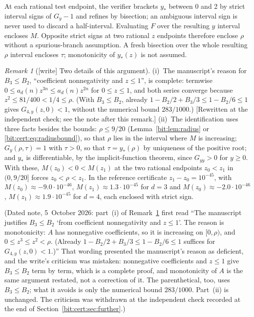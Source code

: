 \documentclass[11pt]{article}
\theoremstyle{definition}\newtheorem{definition}[theorem]{Definition}
\theoremstyle{remark}\newtheorem{remark}[theorem]{Remark}
\begin{document}
At each rational test endpoint, the verifier brackets $y_*$ between 0 and 2 by
strict interval signs of $G_y-1$ and refines by bisection; an ambiguous
interval sign is never used to discard a half-interval. Evaluating $F$ over the
resulting $y$ interval encloses $M$. Opposite strict signs at two rational $z$
endpoints therefore enclose $\rho$ without a spurious-branch assumption. A fresh
bisection over the whole resulting $\rho$ interval encloses $\tau$;
monotonicity of $y_*(z)$ is not assumed.

\begin{remark}[\textsf{[write]} Two details of this argument]\label{bit:cert:rem:identify}
(i)~The manuscript's reason for $B_3\le B_2$, ``coefficient nonnegativity and
$z\le1$'', is complete: termwise $0\le a_d(n)z^{3n}\le a_d(n)z^{2n}$ for
$0\le z\le1$, and both series converge because $z^2\le81/400<1/4\le\rho$.
(With $B_3\le B_2$, already $1-B_2/2+B_3/3\le1-B_2/6\le1$ gives
$G_{4,y}(z,0)<1$, without the numerical bound $283/1000$.)
\textup{[}Rewritten at the independent check; see the note after this
remark.\textup{]}
(ii)~The identification uses three facts besides the bounds: $\rho\le9/20$
(Lemma~\ref{bit:lem:radius} or \eqref{bit:cert:eq:radiusbound}), so that
$\rho$ lies in the interval where $M$ is increasing; $G_y(\rho,\tau)=1$ with
$\tau>0$, so that $\tau=y_*(\rho)$ by uniqueness of the positive root; and
$y_*$ is differentiable, by the implicit-function theorem, since
$G_{yy}>0$ for $y\ge0$. With these, $M(z_0)<0<M(z_1)$ at the two rational
endpoints $z_0<z_1$ in $(0,9/20]$ forces $z_0<\rho<z_1$. In the reference
certificate $z_1-z_0=10^{-45}$, with $M(z_0)\approx-9.0\cdot10^{-46}$,
$M(z_1)\approx1.3\cdot10^{-45}$ for $d=3$ and $M(z_0)\approx-2.0\cdot10^{-46}$,
$M(z_1)\approx1.9\cdot10^{-45}$ for $d=4$, each enclosed with strict sign.
\end{remark}
\noindent(Dated note, 5~October 2026: part~(i) of
Remark~\ref{bit:cert:rem:identify} first read ``The manuscript justifies
$B_3\le B_2$ `from coefficient nonnegativity and $z\le1$'. The reason is
monotonicity: $A$ has nonnegative coefficients, so it is increasing on
$[0,\rho)$, and $0\le z^3\le z^2<\rho$. (Already
$1-B_2/2+B_3/3\le1-B_2/6\le1$ suffices for $G_{4,y}(z,0)<1$.)'' That wording
presented the manuscript's reason as deficient, and the write's criticism was
mistaken: nonnegative coefficients and $z\le1$ give $B_3\le B_2$ term by term,
which is a complete proof, and monotonicity of $A$ is the same argument
restated, not a correction of it. The parenthetical, too, uses $B_3\le B_2$;
what it avoids is only the numerical bound $283/1000$. Part~(ii) is unchanged.
The criticism was withdrawn at the independent check recorded at the end of
Section~\ref{bit:cert:sec:further}.)
\end{document}
